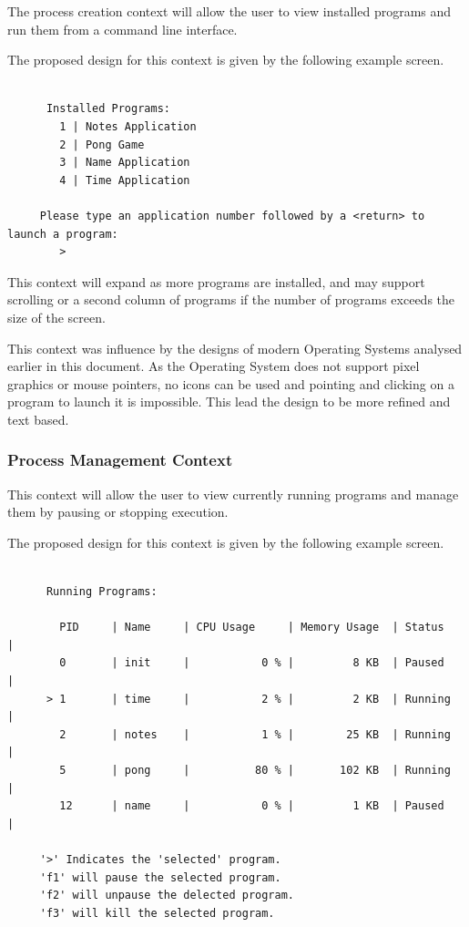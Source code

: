 \documentclass[a4paper]{report}
\begin{document}
The process creation context will allow the user to view installed programs and run them from a command line interface.

The proposed design for this context is given by the following example screen.
{\ttfamily \small
  \begin{framed}
    \begin{verbatim}

      Installed Programs:
        1 | Notes Application
        2 | Pong Game
        3 | Name Application
        4 | Time Application

     Please type an application number followed by a <return> to launch a program:
        > 

    \end{verbatim}
  \end{framed}
}


This context will expand as more programs are installed, and may support scrolling or a second column of programs if the number of programs exceeds the size of the screen.

This context was influence by the designs of modern Operating Systems analysed earlier in this document. As the Operating System does not support pixel graphics or mouse pointers, no icons can be used and pointing and clicking on a program to launch it is impossible. This lead the design to be more refined and text based.


\subsubsection*{Process Management Context}

This context will allow the user to view currently running programs and manage them by pausing or stopping execution.

The proposed design for this context is given by the following example screen.

{\ttfamily \small
  \begin{framed}
    \begin{verbatim}

      Running Programs:

        PID     | Name     | CPU Usage     | Memory Usage  | Status     |
        0       | init     |           0 % |         8 KB  | Paused     |
      > 1       | time     |           2 % |         2 KB  | Running    |
        2       | notes    |           1 % |        25 KB  | Running    |
        5       | pong     |          80 % |       102 KB  | Running    |
        12      | name     |           0 % |         1 KB  | Paused     |

     '>' Indicates the 'selected' program.
     'f1' will pause the selected program.
     'f2' will unpause the delected program.
     'f3' will kill the selected program.

    \end{verbatim}
  \end{framed}
}
\end{document}
